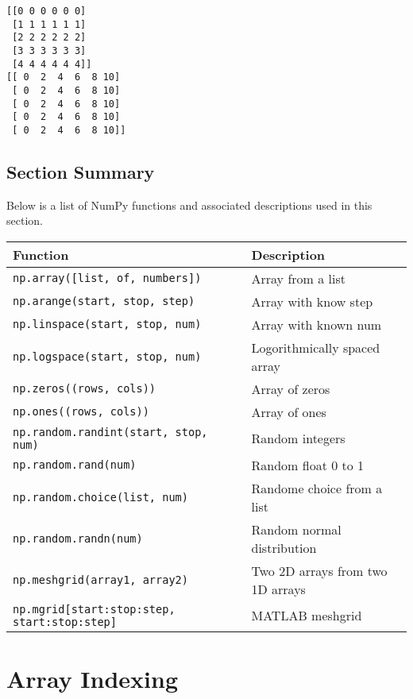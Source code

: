 \documentclass{book}
\newcommand{\passthrough}[1]{#1}
\begin{document}
    \begin{Verbatim}[commandchars=\\\{\}]
[[0 0 0 0 0 0]
 [1 1 1 1 1 1]
 [2 2 2 2 2 2]
 [3 3 3 3 3 3]
 [4 4 4 4 4 4]]
[[ 0  2  4  6  8 10]
 [ 0  2  4  6  8 10]
 [ 0  2  4  6  8 10]
 [ 0  2  4  6  8 10]
 [ 0  2  4  6  8 10]]

    \end{Verbatim}


    
        \hypertarget{section-summary}{%
\subsection{Section Summary}\label{section-summary}}
    




    
        Below is a list of NumPy functions and associated descriptions used in
this section.

\begin{longtable}[]{@{}ll@{}}
\toprule
Function & Description\tabularnewline
\midrule
\endhead
\passthrough{\lstinline!np.array([list, of, numbers])!} & Array from a
list\tabularnewline
\passthrough{\lstinline!np.arange(start, stop, step)!} & Array with know
step\tabularnewline
\passthrough{\lstinline!np.linspace(start, stop, num)!} & Array with
known num\tabularnewline
\passthrough{\lstinline!np.logspace(start, stop, num)!} &
Logorithmically spaced array\tabularnewline
\passthrough{\lstinline!np.zeros((rows, cols))!} & Array of
zeros\tabularnewline
\passthrough{\lstinline!np.ones((rows, cols))!} & Array of
ones\tabularnewline
\passthrough{\lstinline!np.random.randint(start, stop, num)!} & Random
integers\tabularnewline
\passthrough{\lstinline!np.random.rand(num)!} & Random float 0 to
1\tabularnewline
\passthrough{\lstinline!np.random.choice(list, num)!} & Randome choice
from a list\tabularnewline
\passthrough{\lstinline!np.random.randn(num)!} & Random normal
distribution\tabularnewline
\passthrough{\lstinline!np.meshgrid(array1, array2)!} & Two 2D arrays
from two 1D arrays\tabularnewline
\passthrough{\lstinline!np.mgrid[start:stop:step, start:stop:step]!} &
MATLAB meshgrid\tabularnewline
\bottomrule
\end{longtable}
    




    
        \hypertarget{array-indexing}{%
\section{Array Indexing}\label{array-indexing}}
    
\end{document}
